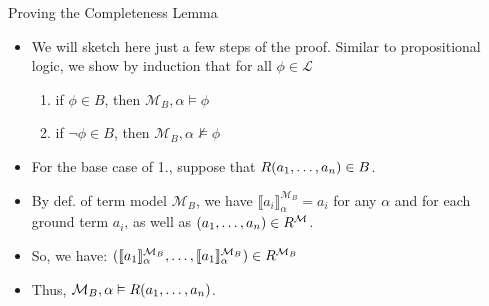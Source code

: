 \begin{frame}{Proving the Completeness Lemma}

	\begin{itemize}
	\itemsep=16pt
  
	\item We will sketch here just a few steps of the proof. Similar to propositional logic, we show by induction that for all $\phi\in\mathcal{L}$

    		\begin{enumerate}[1.]

                      \item if $\phi\in B$, then
                        $\mathcal{M}_B,\alpha\vDash\phi$

                        \item if $\neg\phi\in B$, then
                          $\mathcal{M}_B,\alpha\nvDash\phi$ 
                      
		\end{enumerate}


	\item For the base case of 1., suppose that $R(a_1,\mathellipsis, a_n)\in B$.

	\item By def. of term model $\mathcal{M}_B$, we have $\llbracket a_i\rrbracket^{\mathcal{M}_B}_\alpha=a_i$ for any $\alpha$ and for each ground term $a_i$, as well as $(a_1, \mathellipsis, a_n)\in R^\mathcal{M}$.

	 \item So, we have: $(\llbracket a_1\rrbracket^{\mathcal{M}_B}_\alpha, \mathellipsis, \llbracket a_1\rrbracket^{\mathcal{M}_B}_\alpha)\in R^{\mathcal{M}_B}$
	 
	 \item Thus, $\mathcal{M}_B,\alpha\vDash R(a_1,\mathellipsis, a_n)$.

	\end{itemize}

\end{frame}

